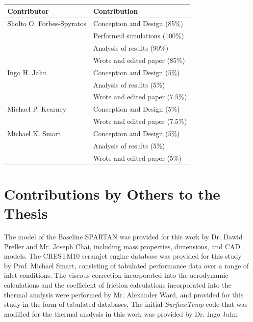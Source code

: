 \begin{center}
  \begin{tabular}{ll}
    \toprule
    Contributor   & Contribution \\
    \midrule
    Sholto O. Forbes-Spyratos             
                                  & Conception and Design (85\%)\\
                                  & Performed simulations (100\%)\\
                                  & Analysis of results (90\%)\\
                                  & Wrote and edited paper (85\%)\\
    \midrule
    Ingo H. Jahn            
                                  & Conception and Design (5\%)\\
                                  & Analysis of results (5\%)\\
                                  & Wrote and edited paper (7.5\%)\\
                                  
        \midrule
        Michael P. Kearney            
								      & Conception and Design (5\%)\\
								      & Wrote and edited paper (7.5\%)\\                       

    \midrule
    Michael K. Smart              
                                  & Conception and Design (5\%)\\
                                  & Analysis of results (5\%)\\
                                  & Wrote and edited paper (5\%)\\
    \bottomrule
  \end{tabular}
\end{center}



\section*{Contributions by Others to the Thesis}

The model of the Baseline SPARTAN was provided for this work by Dr. Dawid Preller and Mr. Joseph Chai, including mass properties, dimensions, and CAD models. The CRESTM10 scramjet engine database was provided for this study by Prof. Michael Smart, consisting of tabulated performance data over a range of inlet conditions. The viscous correction incorporated into the aerodynamic calculations and the coefficient of friction calculations incorporated into the thermal analysis were performed by Mr. Alexander Ward, and provided for this study in the form of tabulated databases. The initial {\it SurfaceTemp} code that was modified for the thermal analysis in this work was provided by Dr. Ingo Jahn. 



